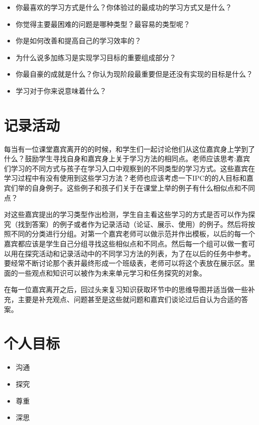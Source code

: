     \begin{itemize}
       \item  你最喜欢的学习方式是什么？你体验过的最成功的学习方式又是什么？
       \item  你觉得主要最困难的问题是哪种类型？最容易的类型呢？
       \item  你是如何改善和提高自己的学习效率的？
       \item  为什么说多加练习是实现学习目标的重要组成部分？
       \item  你最自豪的成就是什么？你认为现阶段最重要但是还没有实现的目标是什么？
       \item  学习对于你来说意味着什么？
    \end{itemize}

\section{记录活动}
     每当有一位课堂嘉宾离开的的时候，和学生们一起讨论他们从这位嘉宾身上学到了什么？鼓励学生寻找自身和嘉宾身上关于学习方法的相同点。老师应该思考:嘉宾们学习的不同方式与孩子在学习入口中观察到的不同类型的学习方式。这些嘉宾在学习过程中有没有使用到这些学习方法？老师也应该考虑一下IPC的的人目标和嘉宾们举的自身例子。这些例子和孩子们关于在课堂上举的例子有什么相似点和不同点？\par
     对这些嘉宾提出的学习类型作出检测，学生自主看这些学习的方式是否可以作为探究（找到答案）的例子或者作为记录活动（论证、展示、使用）的例子。然后将按照不同的分类进行分组。对第一个嘉宾老师可以做示范并作出模板，以后的每一个嘉宾都应该是学生自己分组寻找这些相似点和不同点。然后每一个组可以做一套可以用在探究活动和记录活动中的不同学习方法的列表，为了在以后的任务中参考。要经常不断讨论那个表并最终形成一个班级表，老师可以将这个表放在展示区。里面的一些观点和知识可以被作为未来单元学习和任务探究的对象。\par
     在每一位嘉宾离开之后，回过头来复习知识获取环节中的思维导图并适当做一些补充，主要是补充观点、问题甚至是这些就问题和嘉宾们谈论过后自认为合适的答案。\par



\section{个人目标}
     \begin{itemize}
       \item 沟通
       \item 探究
       \item 尊重
       \item 深思   
     \end{itemize}
